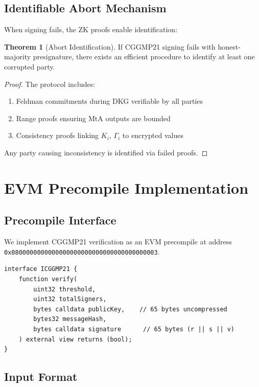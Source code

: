\documentclass[11pt,a4paper]{article}
\theoremstyle{definition}
\newtheorem{theorem}{Theorem}
\begin{document}
\subsection{Identifiable Abort Mechanism}

When signing fails, the ZK proofs enable identification:

\begin{theorem}[Abort Identification]
If CGGMP21 signing fails with honest-majority presignature, there exists an efficient procedure to identify at least one corrupted party.
\end{theorem}

\begin{proof}
The protocol includes:
\begin{enumerate}
\item Feldman commitments during DKG verifiable by all parties
\item Range proofs ensuring MtA outputs are bounded
\item Consistency proofs linking $K_i$, $\Gamma_i$ to encrypted values
\end{enumerate}
Any party causing inconsistency is identified via failed proofs.
\end{proof}

\section{EVM Precompile Implementation}

\subsection{Precompile Interface}

We implement CGGMP21 verification as an EVM precompile at address \texttt{0x0800000000000000000000000000000000000003}.

\begin{lstlisting}[language=Solidity]
interface ICGGMP21 {
    function verify(
        uint32 threshold,
        uint32 totalSigners,
        bytes calldata publicKey,    // 65 bytes uncompressed
        bytes32 messageHash,
        bytes calldata signature      // 65 bytes (r || s || v)
    ) external view returns (bool);
}
\end{lstlisting}

\subsection{Input Format}
\end{document}
